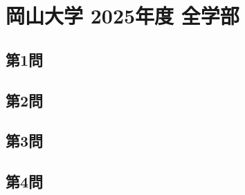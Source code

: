 ﻿\documentclass[../../uem_oka_a.tex]{subfiles}
\begin{document}
    \section{岡山大学 2025年度 全学部}
    \subsection{第1問}
    
    \clearpage
    \subsection{第2問}
    
    \clearpage
    \subsection{第3問}
    
    \clearpage
    \subsection{第4問}
    
\end{document}
